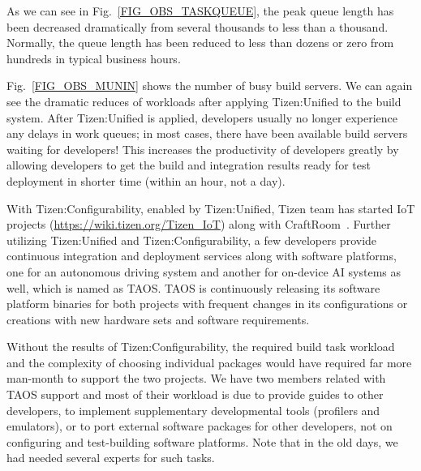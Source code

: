 As we can see in Fig.~\ref{FIG_OBS_TASKQUEUE}, the peak queue length has been decreased dramatically from several thousands to less than a thousand.
Normally, the queue length has been reduced to less than dozens or zero from hundreds in typical business hours.


Fig.~\ref{FIG_OBS_MUNIN} shows the number of busy build servers.
We can again see the dramatic reduces of workloads after applying Tizen:Unified to the build system.
After Tizen:Unified is applied, developers usually no longer experience any delays in work queues; in most cases, there have been available build servers waiting for developers! This increases the productivity of developers greatly by allowing developers to get the build and integration results ready for test deployment in shorter time (within an hour, not a day).


With Tizen:Configurability, enabled by Tizen:Unified, Tizen team has started IoT projects (\url{https://wiki.tizen.org/Tizen_IoT}) along with CraftRoom~\cite{5CraftroomURL}.
Further utilizing Tizen:Unified and Tizen:Configurability, a few developers provide continuous integration and deployment services along with software platforms, one for an autonomous driving system and another for on-device AI systems as well, which is named as TAOS.
TAOS is continuously releasing its software platform binaries for both projects with frequent changes in its configurations or creations with new hardware sets and software requirements.


Without the results of Tizen:Configurability, the required build task workload and the complexity of choosing individual packages would have required far more man-month to support the two projects.
We have two members related with TAOS support and most of their workload is due to provide guides to other developers, to implement supplementary developmental tools (profilers and emulators), or to port external software packages for other developers, not on configuring and test-building software platforms.
Note that in the old days, we had needed several experts for such tasks.


